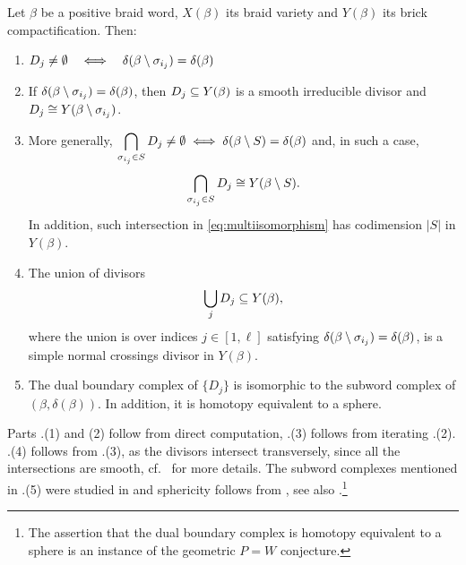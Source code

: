 \begin{lemma}\label{lem:boundary_div} Let $\beta$ be a positive braid word, $X(\beta)$ its braid variety and $Y(\beta)$ its brick compactification. Then:
\begin{enumerate}
    \item $D_j\ne\emptyset
  \quad\Longleftrightarrow\quad
  \delta(\beta\setminus \sigma_{i_j})=\delta(\beta)$\\

  \item If $\delta(\beta\setminus \sigma_{i_j})=\delta(\beta)$, then $D_j\subseteq Y(\beta)$ is a smooth irreducible divisor and $D_j\cong Y(\beta\setminus \sigma_{i_j})$.\\

  \item More generally, $\displaystyle\bigcap_{\sigma_{i_j}\in S}D_j\ne\emptyset\iff \delta(\beta\setminus S)=\delta(\beta)$ and, in such a case,
  \begin{equation}\label{eq:multiisomorphism}
 \bigcap_{\sigma_{i_j}\in S}D_j\cong Y(\beta\setminus S).
\end{equation}
In addition, such intersection in \eqref{eq:multiisomorphism} has codimension $|S|$ in $Y(\beta)$.\\
 \item The union of divisors
 $$\bigcup_{j}D_j\subseteq Y(\beta),$$
 where the union is over indices $j\in[1,\ell]$ satisfying $\delta(\beta\setminus \sigma_{i_j})=\delta(\beta)$, is a simple normal crossings divisor in $Y(\beta)$.\\

  \item The dual boundary complex of $\{D_j\}$ is isomorphic to the subword complex of $(\beta,\delta(\beta))$. In addition, it is homotopy equivalent to a sphere.
  \sbs
\end{enumerate}
\end{lemma}
Parts .(1) and (2) follow from direct computation, .(3) follows from iterating .(2). .(4) follows from .(3), as the divisors intersect transversely, since all the intersections are smooth, cf.~\cite[Theorem 4.11]{CGGS2} for more details. The subword complexes mentioned in .(5) were studied in \cite{KnutsonMiller_04} and sphericity follows from \cite[Corollary 3.8]{KnutsonMiller_04}, see also \cite[Section 4]{CGGS2}.\footnote{The assertion that the dual boundary complex is homotopy equivalent to a sphere is an instance of the geometric $P=W$ conjecture.}\\

